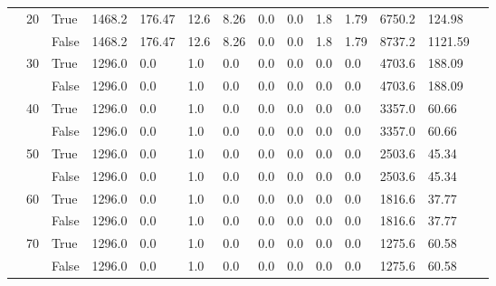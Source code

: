 \begin{landscape}
\begin{small}
\begin{longtable}[c]{@{}lll|ll|ll|ll|ll|lll@{}}
   & 20 & True  & 1468.2          & 176.47         & 12.6          & 8.26          & 0.0           & 0.0           & 1.8           & 1.79          & 6750.2        & 124.98      &  \\
   &    & False & 1468.2          & 176.47         & 12.6          & 8.26          & 0.0           & 0.0           & 1.8           & 1.79          & 8737.2        & 1121.59     &  \\
   & 30 & True  & 1296.0          & 0.0            & 1.0           & 0.0           & 0.0           & 0.0           & 0.0           & 0.0           & 4703.6        & 188.09      &  \\
   &    & False & 1296.0          & 0.0            & 1.0           & 0.0           & 0.0           & 0.0           & 0.0           & 0.0           & 4703.6        & 188.09      &  \\
   & 40 & True  & 1296.0          & 0.0            & 1.0           & 0.0           & 0.0           & 0.0           & 0.0           & 0.0           & 3357.0        & 60.66       &  \\
   &    & False & 1296.0          & 0.0            & 1.0           & 0.0           & 0.0           & 0.0           & 0.0           & 0.0           & 3357.0        & 60.66       &  \\
   & 50 & True  & 1296.0          & 0.0            & 1.0           & 0.0           & 0.0           & 0.0           & 0.0           & 0.0           & 2503.6        & 45.34       &  \\
   &    & False & 1296.0          & 0.0            & 1.0           & 0.0           & 0.0           & 0.0           & 0.0           & 0.0           & 2503.6        & 45.34       &  \\
   & 60 & True  & 1296.0          & 0.0            & 1.0           & 0.0           & 0.0           & 0.0           & 0.0           & 0.0           & 1816.6        & 37.77       &  \\
   &    & False & 1296.0          & 0.0            & 1.0           & 0.0           & 0.0           & 0.0           & 0.0           & 0.0           & 1816.6        & 37.77       &  \\
   & 70 & True  & 1296.0          & 0.0            & 1.0           & 0.0           & 0.0           & 0.0           & 0.0           & 0.0           & 1275.6        & 60.58       &  \\
   &    & False & 1296.0          & 0.0            & 1.0           & 0.0           & 0.0           & 0.0           & 0.0           & 0.0           & 1275.6        & 60.58       &  \\

\end{longtable}
\end{small}
\end{landscape}
